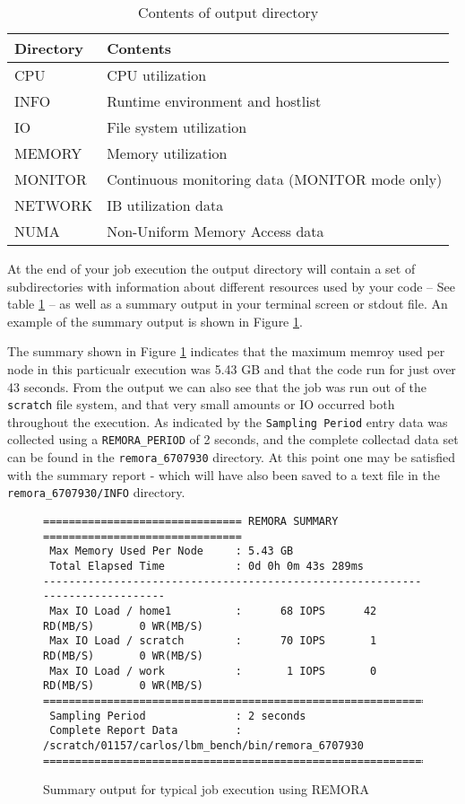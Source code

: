 \documentclass[10pt,a4paper]{report}
\begin{document}
\begin{table}
\begin{center}
\begin{tabular}{|l|l|}
\hline
\bf{Directory} & \bf{Contents}\\\hline
CPU	      & CPU utilization\\\hline
INFO      & Runtime environment and hostlist\\\hline
IO        & File system utilization\\\hline 
MEMORY    & Memory utilization\\\hline
MONITOR   & Continuous monitoring data (MONITOR mode only)\\\hline
NETWORK   & IB utilization data\\\hline
NUMA      & Non-Uniform Memory Access data\\
\hline
\end{tabular}
\label{tab:outdir}
\caption{Contents of output directory}
\end{center}
\end{table}

At the end of your job execution the output directory will contain a set of subdirectories with information about different resources used by your code -- See table \ref{tab:outdir} -- as well as a summary output in your terminal screen or stdout file. An example of the summary output is shown in Figure \ref{fig:summary}.

The summary shown in Figure \ref{fig:summary} indicates that the maximum memroy used per node in this particualr execution was 5.43 GB and that the code run for just over 43 seconds. From the output we can also see that the job was run out of the \verb+scratch+ file system, and that very small amounts or IO occurred both throughout the execution. As indicated by the \verb+Sampling Period+ entry data was collected using a \verb+REMORA_PERIOD+ of 2 seconds, and the complete collectad data set can be found in the \verb+remora_6707930+ directory. At this point one may be satisfied with the summary report - which will have also been saved to a text file in the \verb+remora_6707930/INFO+ directory.

\begin{figure}
\begin{verbatim}
=============================== REMORA SUMMARY ===============================
 Max Memory Used Per Node     : 5.43 GB
 Total Elapsed Time           : 0d 0h 0m 43s 289ms
------------------------------------------------------------------------------
 Max IO Load / home1          :      68 IOPS      42 RD(MB/S)       0 WR(MB/S)
 Max IO Load / scratch        :      70 IOPS       1 RD(MB/S)       0 WR(MB/S)
 Max IO Load / work           :       1 IOPS       0 RD(MB/S)       0 WR(MB/S)
==============================================================================
 Sampling Period              : 2 seconds
 Complete Report Data         : /scratch/01157/carlos/lbm_bench/bin/remora_6707930
==============================================================================
\end{verbatim}
\caption{Summary output for typical job execution using REMORA}
\label{fig:summary}
\end{figure}
\end{document}
